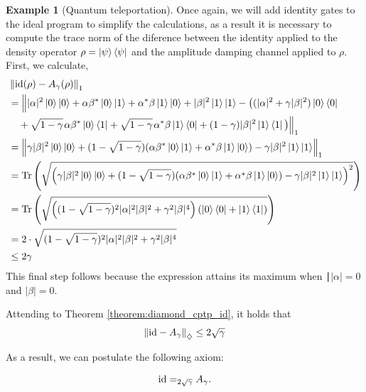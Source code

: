 \documentclass[10pt,a4paper]{amsart}
\theoremstyle{definition}
\theoremstyle{definition}
\newtheorem{example}[definition]{Example}
\theoremstyle{definition}
\theoremstyle{definition}
\theoremstyle{definition}
\theoremstyle{definition}
\begin{document}
\begin{example}[Quantum teleportation]
Once again, we will add identity gates to the ideal program to simplify the calculations, as a result it is necessary to compute the trace norm of the diference between the identity applied to the density operator $\rho = \ket{\psi} \bra{\psi}$ and the amplitude damping channel applied to $\rho$.
First, we calculate, 
\begin{align*}
  & \left\lVert  \mathrm{id}(\rho) - A_{\gamma}(\rho) \right\rVert_{1} \\
  & =    \Big\lVert  |\alpha|^{2} \ket{0} \ket{0} + \alpha \beta^{*} \ket{0} \ket{1} + \alpha^{*} \beta \ket{1} \ket{0} + |\beta|^{2} \ket{1} \ket{1}  - \big((|\alpha|^{2} + \gamma |\beta|^{2}) \ket{0}\bra{0} \\ 
  & \hspace{10pt}  +  \sqrt{1-\gamma} \hspace{1pt} \alpha \beta^{*} \ket{0}\bra{1} + \sqrt{1-\gamma} \hspace{1pt} \alpha^{*} \beta \ket{1}\bra{0} + (1-\gamma) |\beta|^{2} \ket{1}\bra{1}\big) \Big\rVert_1 \\
   & = \left\lVert \gamma |\beta|^{2} \ket{0} \ket{0} + (1-\sqrt{1-\gamma}) (\alpha \beta^{*} \ket{0} \ket{1} + \alpha^{*} \beta \ket{1} \ket{0}) - \gamma |\beta|^{2} \ket{1} \ket{1} \right\rVert_{1} \\
   & = \text{Tr} \left( \sqrt{\left( \gamma |\beta|^{2} \ket{0} \ket{0} + (1-\sqrt{1-\gamma}) (\alpha \beta^{*} \ket{0} \ket{1} + \alpha^{*} \beta \ket{1} \ket{0}) - \gamma |\beta|^{2} \ket{1} \ket{1}  \right)^2}\right) \\
   & = \text{Tr} \left( \sqrt{\left( (1-\sqrt{1-\gamma})^{2} |\alpha|^{2}|\beta|^{2} + \gamma^{2} |\beta|^{4} \right) (\ket{0} \bra{0} + \ket{1} \bra{1} ) } \right) \\
   & = 2 \cdot \sqrt{  (1-\sqrt{1-\gamma})^{2} |\alpha|^{2}|\beta|^{2} + \gamma^{2} |\beta|^{4}} \\
   & \leq 2 \gamma
\end{align*}
This final step follows because the expression attains its maximum when 
∣$|\alpha|=0 $ and $|\beta|=0.$

Attending to Theorem \ref{theorem:diamond_cptp_id}, it holds that
\begin{align*}
  \left\lVert  \mathrm{id} - A_\gamma \right\rVert_{\diamondsuit} \leq 2 \sqrt{\gamma}
\end{align*}

As a result, we can postulate the following axiom:

    \begin{align} \label{eq:amp_damp_teleport}
        \mathrm{id} =_{2 \sqrt{\gamma}} A_\gamma.
    \end{align}



\end{example}
\end{document}
